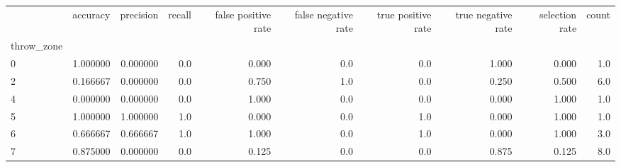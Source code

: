 \begin{tabular}{lrrrrrrrrr}
\toprule
{} &  accuracy &  precision &  recall &  false positive rate &  false negative rate &  true positive rate &  true negative rate &  selection rate &  count \\
throw\_zone &           &            &         &                      &                      &                     &                     &                 &        \\
\midrule
0          &  1.000000 &   0.000000 &     0.0 &                0.000 &                  0.0 &                 0.0 &               1.000 &           0.000 &    1.0 \\
2          &  0.166667 &   0.000000 &     0.0 &                0.750 &                  1.0 &                 0.0 &               0.250 &           0.500 &    6.0 \\
4          &  0.000000 &   0.000000 &     0.0 &                1.000 &                  0.0 &                 0.0 &               0.000 &           1.000 &    1.0 \\
5          &  1.000000 &   1.000000 &     1.0 &                0.000 &                  0.0 &                 1.0 &               0.000 &           1.000 &    1.0 \\
6          &  0.666667 &   0.666667 &     1.0 &                1.000 &                  0.0 &                 1.0 &               0.000 &           1.000 &    3.0 \\
7          &  0.875000 &   0.000000 &     0.0 &                0.125 &                  0.0 &                 0.0 &               0.875 &           0.125 &    8.0 \\
\bottomrule
\end{tabular}
